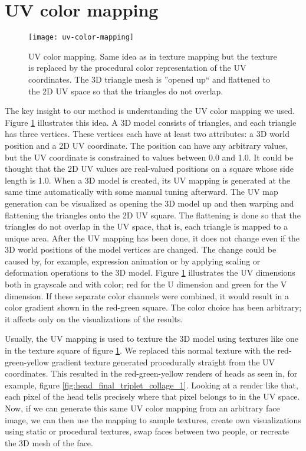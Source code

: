 \section{UV color mapping}
\label{sec:uv_color_mapping}

\begin{figure}[h]
    \texttt{[image: uv-color-mapping]}
    \caption[UV color mapping]{UV color mapping. Same idea as in texture mapping but the texture is replaced by the procedural color representation of the UV coordinates. The 3D triangle mesh is ''opened up`` and flattened to the 2D UV space so that the triangles do not overlap.}
    \label{fig:uv_color_mapping_1}
\end{figure}

The key insight to our method is understanding the UV color mapping we used. Figure \ref{fig:uv_color_mapping_1} illustrates this idea. A 3D model consists of triangles, and each triangle has three vertices. These vertices each have at least two attributes: a 3D world position and a 2D UV coordinate. The position can have any arbitrary values, but the UV coordinate is constrained to values between 0.0 and 1.0. It could be thought that the 2D UV values are real-valued positions on a square whose side length is 1.0. When a 3D model is created, its UV mapping is generated at the same time automatically with some manual tuning afterward. The UV map generation can be visualized as opening the 3D model up and then warping and flattening the triangles onto the 2D UV square. The flattening is done so that the triangles do not overlap in the UV space, that is, each triangle is mapped to a unique area. After the UV mapping has been done, it does not change even if the 3D world positions of the model vertices are changed. The change could be caused by, for example, expression animation or by applying scaling or deformation operations to the 3D model. Figure \ref{fig:uv_color_mapping_1} illustrates the UV dimensions both in grayscale and with color; red for the U dimension and green for the V dimension. If these separate color channels were combined, it would result in a color gradient shown in the red-green square. The color choice has been arbitrary; it affects only on the visualizations of the results.

Usually, the UV mapping is used to texture the 3D model using textures like one in the texture square of figure \ref{fig:uv_color_mapping_1}. We replaced this normal texture with the red-green-yellow gradient texture generated procedurally straight from the UV coordinates. This resulted in the red-green-yellow renders of heads as seen in, for example, figure \ref{fig:head_final_triplet_collage_1}. Looking at a render like that, each pixel of the head tells precisely where that pixel belongs to in the UV space. Now, if we can generate this same UV color mapping from an arbitrary face image, we can then use the mapping to sample textures, create own visualizations using static or procedural textures, swap faces between two people, or recreate the 3D mesh of the face.


